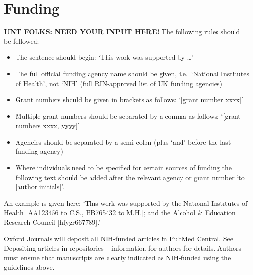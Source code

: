 \documentclass{bioinfo}
\providecommand{\tightlist}{%
  \setlength{\itemsep}{0pt}\setlength{\parskip}{0pt}}
\begin{document}
\section*{Funding}

\textbf{UNT FOLKS: NEED YOUR INPUT HERE!} The following rules should be
followed:

\begin{itemize}
\tightlist
\item
  The sentence should begin: `This work was supported by \ldots{}' -
\item
  The full official funding agency name should be given, i.e.~`National
  Institutes of Health', not `NIH' (full RIN-approved list of UK funding
  agencies)
\item
  Grant numbers should be given in brackets as follows: `{[}grant number
  xxxx{]}'
\item
  Multiple grant numbers should be separated by a comma as follows:
  `{[}grant numbers xxxx, yyyy{]}'
\item
  Agencies should be separated by a semi-colon (plus `and' before the
  last funding agency)
\item
  Where individuals need to be specified for certain sources of funding
  the following text should be added after the relevant agency or grant
  number `to {[}author initials{]}'.
\end{itemize}

An example is given here: `This work was supported by the National
Institutes of Health {[}AA123456 to C.S., BB765432 to M.H.{]}; and the
Alcohol \& Education Research Council {[}hfygr667789{]}.'

Oxford Journals will deposit all NIH-funded articles in PubMed Central.
See Depositing articles in repositories -- information for authors for
details. Authors must ensure that manuscripts are clearly indicated as
NIH-funded using the guidelines above.




\end{document}
